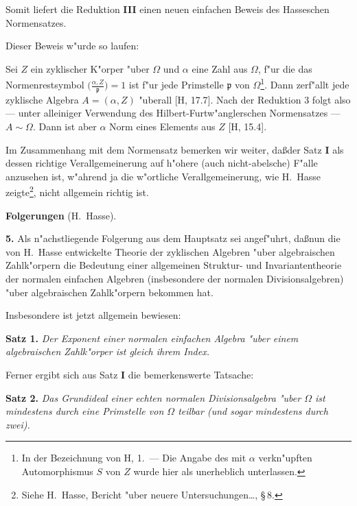 \documentclass[12pt,a4paper]{article}
\theoremstyle{plain}
\begin{document}
Somit liefert die Reduktion \textbf{III} einen neuen einfachen Beweis des Hasseschen Normensatzes.

Dieser Beweis w"urde so laufen:

Sei $Z$ ein zyklischer K"orper "uber $\Omega$ und $\alpha$ eine Zahl aus $\Omega$, f"ur die das Normenrestsymbol $\bigl(\frac{\alpha, Z}{\mathfrak{p}}\bigr) = 1$ ist f"ur jede Primstelle $\mathfrak{p}$ von $\Omega$\footnote{In der Bezeichnung von H, 1.\ --- Die Angabe des mit $\alpha$ verkn"upften Automorphismus $S$ von $Z$ wurde hier als unerheblich unterlassen.}. Dann zerf"allt jede zyklische Algebra $A = (\alpha, Z)$ "uberall [H, 17.7]. Nach der Reduktion 3 folgt also --- unter alleiniger Verwendung des Hilbert-Furtw"anglerschen Normensatzes --- $A \sim \Omega$. Dann ist aber $\alpha$ Norm eines Elements aus $Z$ [H, 15.4].

Im Zusammenhang mit dem Normensatz bemerken wir weiter, da\ss der Satz \textbf{I} als dessen richtige Verallgemeinerung auf h"ohere (auch nicht-abelsche) F"alle anzusehen ist, w"ahrend ja die w"ortliche Verallgemeinerung, wie H.\ Hasse zeigte\footnote{Siehe H.\ Hasse, Bericht "uber neuere Untersuchungen\ldots, \S\,8.}, nicht allgemein richtig ist.

\medskip\noindent\textbf{Folgerungen} (H.\ Hasse).

\medskip\noindent\textbf{5.}
Als n"achstliegende Folgerung aus dem Hauptsatz sei angef"uhrt, da\ss nun die von H.\ Hasse entwickelte Theorie der zyklischen Algebren "uber algebraischen Zahlk"orpern die Bedeutung einer allgemeinen Struktur- und Invariantentheorie der normalen einfachen Algebren (insbesondere der normalen Divisionsalgebren) "uber algebraischen Zahlk"orpern bekommen hat.

Insbesondere ist jetzt allgemein bewiesen:

\medskip\noindent\textbf{Satz 1.}
\textit{Der Exponent einer normalen einfachen Algebra "uber einem algebraischen Zahlk"orper ist gleich ihrem Index.}

Ferner ergibt sich aus Satz \textbf{I} die bemerkenswerte Tatsache:

\medskip\noindent\textbf{Satz 2.}
\textit{Das Grundideal einer echten normalen Divisionsalgebra "uber $\Omega$ ist mindestens durch eine Primstelle von $\Omega$ teilbar (und sogar mindestens durch zwei).}
\end{document}
